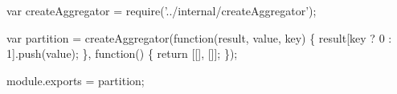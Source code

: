 \begin{DoxyCodeInclude}
var createAggregator = require(\textcolor{stringliteral}{'../internal/createAggregator'});

var partition = createAggregator(\textcolor{keyword}{function}(result, value, key) \{
  result[key ? 0 : 1].push(value);
\}, \textcolor{keyword}{function}() \{ \textcolor{keywordflow}{return} [[], []]; \});

module.exports = partition;
\end{DoxyCodeInclude}
 